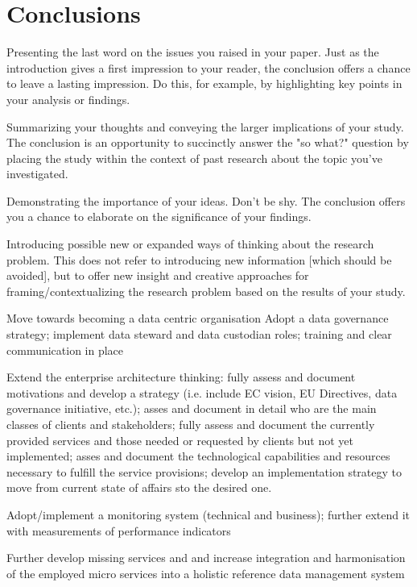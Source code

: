 \section{Conclusions}
\label{sec:conclusions}
	
 Presenting the last word on the issues you raised in your paper. Just as the introduction gives a first impression to your reader, the conclusion offers a chance to leave a lasting impression. Do this, for example, by highlighting key points in your analysis or findings.
 
 Summarizing your thoughts and conveying the larger implications of your study. The conclusion is an opportunity to succinctly answer the "so what?" question by placing the study within the context of past research about the topic you've investigated.
 
 Demonstrating the importance of your ideas. Don't be shy. The conclusion offers you a chance to elaborate on the significance of your findings.
 
 Introducing possible new or expanded ways of thinking about the research problem. This does not refer to introducing new information [which should be avoided], but to offer new insight and creative approaches for framing/contextualizing the research problem based on the results of your study.
 
 Move towards becoming a data centric organisation
 Adopt a data governance strategy; implement data steward and data custodian roles; training and clear communication in place
 
 Extend the enterprise architecture thinking: fully assess and document motivations and develop a strategy (i.e. include EC vision, EU Directives, data governance initiative, etc.); asses and document in detail who are the main classes of clients and stakeholders; fully assess and document the currently provided services and those needed or requested by clients but not yet implemented; asses and document the technological capabilities and resources necessary to fulfill the service provisions; develop an implementation strategy to move from current state of affairs sto the desired one.
 
 Adopt/implement a monitoring system (technical and business); further extend it with measurements of performance indicators
 
 Further develop missing services and and increase integration and harmonisation of the employed micro services into a holistic reference data management system
 
